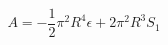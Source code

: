 \begin{equation}
A = -\frac{1}{2} \pi^2 R^4 \epsilon + 2 \pi^2 R^3 S_1
\label{action}
\end{equation}

